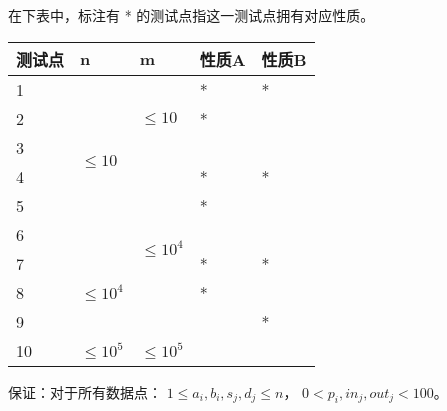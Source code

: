 \documentclass{ctexart}
\begin{document}
在下表中，标注有 * 的测试点指这一测试点拥有对应性质。

\bigskip

\begin{table}[ht]
  \centering
  \begin{tabularx}{\textwidth}{|X|X|X|X|X|}
    \hline
    \textbf{测试点} & \textbf{n} & \textbf{m} & \textbf{性质A} & \textbf{性质B} \\\hline
    1 & \multirow{6}{*}{$\le 10$}  & \multirow{3}{*}{$\le 10$} & * & * \\\cline{1-1} \cline{4-5}
    2 &                             &                            & * &   \\\cline{1-1} \cline{4-5}
    3 &                             &                            &   &   \\\cline{1-1} \cline{3-5}
    4 &                             & \multirow{6}{*}{$\le 10^4$}& * & * \\\cline{1-1} \cline{4-5}
    5 &                             &                            & * &   \\\cline{1-1} \cline{4-5}
    6 &                             &                            &   &   \\\cline{1-2} \cline{3-5}
    7 & \multirow{3}{*}{$\le 10^4$} &                            & * & * \\\cline{1-1} \cline{4-5}
    8 &                             &                            & * &   \\\cline{1-1} \cline{4-5}
    9 &                             &                            &   & * \\\hline
    10& $\le 10^5$                  & $\le 10^5$                 &   &   \\\hline
  \end{tabularx}
\end{table}

\bigskip

保证：对于所有数据点：
$ 1 \le a_i, b_i, s_j, d_j \le n $， $ 0 < p_i, in_j, out_j < 100 $。
\end{document}
